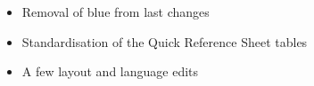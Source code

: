 
\subtitle{beta 2.1.5}

\begin{itemize}
\item Removal of blue from last changes
\item Standardisation of the Quick Reference Sheet tables
\item A few layout and language edits
\end{itemize}
